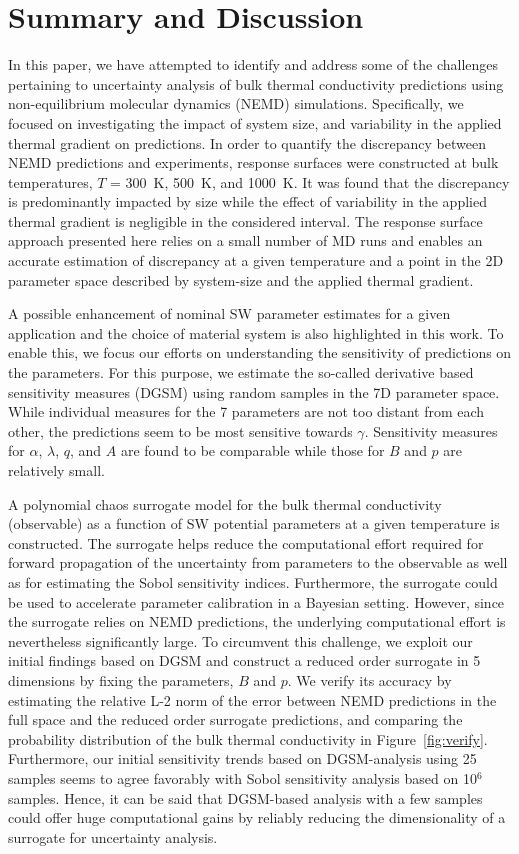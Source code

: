 \section{Summary and Discussion}
\label{sec:disc}

In this paper, we have attempted to identify and address some of the challenges
pertaining to uncertainty analysis of bulk thermal conductivity predictions 
using non-equilibrium molecular dynamics (NEMD) simulations. Specifically, we focused
on investigating the impact of system size, and variability in the applied thermal
gradient on predictions. In order to quantify the discrepancy between NEMD
predictions and experiments, response surfaces were  
constructed at bulk temperatures, $T$ = 300~K, 500~K, and 1000~K.  
It was found that the discrepancy is predominantly impacted by size while the 
effect of variability in the applied thermal gradient is negligible in the considered
interval. The response surface approach presented here relies on a small number of
MD runs and enables an accurate estimation of discrepancy at a given temperature
and a point in the 2D parameter space described by system-size and the applied
thermal gradient. 

A possible enhancement of nominal SW parameter estimates for a given application
and the choice of material system is also highlighted in this work. To enable this,
we focus our efforts on understanding the sensitivity of predictions on the 
parameters. For this purpose, we estimate the so-called derivative based sensitivity
measures (DGSM) using random samples in the 7D parameter space. While individual
measures for the 7 parameters are not too distant from each other, the predictions
seem to be most sensitive towards $\gamma$. Sensitivity measures for $\alpha$,
$\lambda$, $q$, and $A$ are found to be comparable while those for $B$ and $p$
are relatively small. 

A polynomial chaos surrogate model for the bulk thermal conductivity (observable)
as a function of SW potential
parameters at a given temperature is constructed. The surrogate helps reduce the
computational effort required for forward propagation of the uncertainty from
parameters to the observable as well as for estimating the Sobol sensitivity indices.
Furthermore, the surrogate could be used to accelerate parameter calibration in a
Bayesian setting. However, since the surrogate relies on NEMD predictions, the
underlying computational effort is nevertheless significantly large. To circumvent
this challenge, we exploit our initial findings based on DGSM and construct
a reduced order surrogate in 5 dimensions by fixing the parameters, $B$ and $p$.
We verify its accuracy by estimating the relative
L-2 norm of the error between NEMD predictions in the full space and the reduced
order surrogate predictions, and comparing the probability distribution of the
bulk thermal conductivity in Figure~\ref{fig:verify}. Furthermore, our initial
sensitivity trends based on DGSM-analysis using 25 samples seems to agree favorably
with Sobol sensitivity analysis based on 10$^{6}$ samples. Hence, it can be said
that DGSM-based analysis with a few samples could offer huge computational gains
by reliably reducing the dimensionality of a surrogate for uncertainty analysis. 


